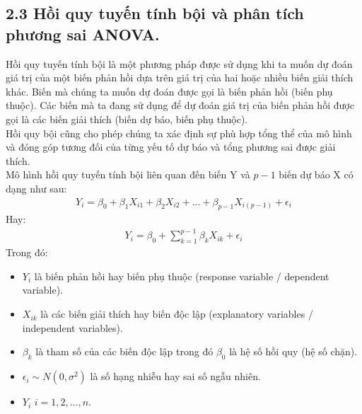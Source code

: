 \documentclass[a4paper]{article}
\newcommand{\gachdau}{\hspace*{1.5em}\ignorespaces}
\begin{document}
        \subsection*{2.3 Hồi quy tuyến tính bội và phân tích phương sai ANOVA.}
            \fontsize{13pt}{15pt}\selectfont
            \gachdau
            Hồi quy tuyến tính bội là một phương pháp được sử dụng khi ta muốn dự đoán giá trị của một biến phản hồi dựa trên giá trị của hai hoặc nhiều biến giải thích khác. Biến mà chúng ta muốn dự đoán được gọi là biến phản hồi (biến phụ thuộc). Các biến mà ta đang sử dụng để dự đoán giá trị của biến phản hồi được gọi là các biến giải thích (biến dự báo, biến phụ thuộc).\\
            \gachdau
            Hồi quy bội cũng cho phép chúng ta xác định sự phù hợp tổng thể của mô hình và đóng góp tương đối của từng yếu tố dự báo và tổng phương sai được giải thích.\\
            \gachdau
            Mô hình hồi quy tuyến tính bội liên quan đến biến Y và $p - 1$ biến dự báo X có dạng như sau:
            \vspace{-6pt}
            \begin{align*}
                Y_i = \beta_0 + \beta_1X_{i1} + \beta_2X_{i2} + ... + \beta_{p-1}X_{i(p-1)} + \epsilon_i
            \end{align*}
            \vspace{-10pt}
            \gachdau
            Hay:
            \vspace{-5pt}
            \begin{align*}
                Y_i = \beta_0 + \sum_{k=1}^{p-1}\beta_kX_{ik} + \epsilon_i
            \end{align*}
            \gachdau
            Trong đó:
            \begin{itemize}[leftmargin=3em, itemsep=-1.5em, parsep=1.6em]
                \vspace{-4pt}
                \item \fontsize{13pt}{15pt}\selectfont $Y_i$ là biến phản hồi hay biến phụ thuộc (response variable / dependent variable).
                \item \fontsize{13pt}{15pt}\selectfont $X_{ik}$ là các biến giải thích hay biến độc lập (explanatory variables / independent variables).
                \item \fontsize{13pt}{15pt}\selectfont $\beta_k$ là tham số của các biến độc lập trong đó $\beta_0$ là hệ số hồi quy (hệ số chặn).
                \item \fontsize{13pt}{15pt}\selectfont $\epsilon_i \sim N(0,\sigma^2)$ là số hạng nhiễu hay sai số ngẫu nhiên.
                \item \fontsize{13pt}{15pt}\selectfont $Y_i$ $i = 1, 2, ..., n.$
            \end{itemize}
\end{document}
